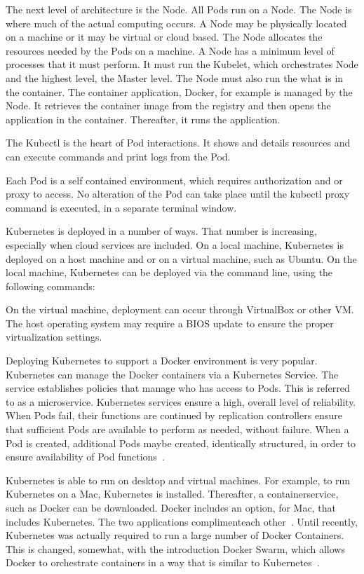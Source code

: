The next level of architecture is the Node.  All Pods run on a Node.
The Node is where much of the actual computing occurs.  A Node may be
physically located on a machine or it may be virtual or cloud
based. The Node allocates the resources needed by the Pods on a
machine.  A Node has a minimum level of processes that it must
perform.  It must run the Kubelet, which orchestrates Node and the
highest level, the Master level.  The Node must also run the what is
in the container.  The container application, Docker, for example is
managed by the Node.  It retrieves the container image from the
registry and then opens the application in the container.  Thereafter,
it runs the application. 

The Kubectl is the heart of Pod interactions.  It shows and details
resources and can execute commands and print logs from the Pod. 

Each Pod is a self contained environment, which requires authorization
and or proxy to access.  No alteration of the Pod can take place until
the kubectl proxy command is executed, in a separate terminal window.   
 


Kubernetes is deployed in a number of ways.  That number is
increasing, especially when cloud services are included.  On a local
machine, Kubernetes is deployed on a host machine and or on a virtual
machine, such as Ubuntu.  On the local machine, Kubernetes can be
deployed via the command line, using the following commands: 


On the virtual machine, deployment can occur through VirtualBox or
other VM.  The host operating system may require a BIOS update to
ensure the proper virtualization settings.   

Deploying Kubernetes to support a Docker environment is very popular.
Kubernetes can manage the Docker containers via a Kubernetes Service.
The service establishes policies that manage who has access to Pods.
This is referred to as a microservice.  Kubernetes services ensure a
high, overall level of reliability.  When Pods fail, their functions
are continued by replication controllers ensure that sufficient Pods
are available to perform as needed, without failure.  When a Pod is
created, additional Pods maybe created, identically structured, in
order to ensure availability of Pod functions~\cite{service}.  

Kubernetes is able to run on desktop and virtual machines.  For
example, to run Kubernetes on a Mac, Kubernetes is installed.
Thereafter, a containerservice, such as Docker can be downloaded. 
Docker includes an option, for Mac, that includes Kubernetes.  The 
two applications complimenteach other~\cite{service}.  Until recently,
Kubernetes was actually required to run a large number of Docker
Containers.  This is changed, somewhat, with the introduction Docker
Swarm, which allows Docker to orchestrate containers in a way that is
similar to Kubernetes~\cite{services}.

